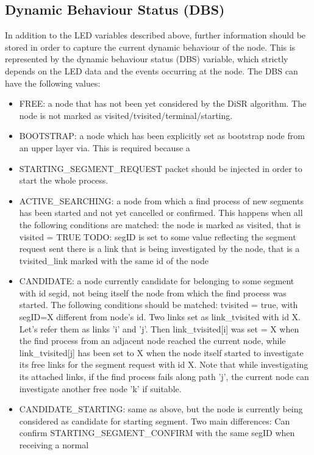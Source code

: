 \documentclass[final,journal,letterpaper]{IEEEtran}
\begin{document}
\subsection{Dynamic Behaviour Status (DBS)}
In addition to the LED variables described above, further information
should be stored in order to capture the current dynamic behaviour of
the node. This is represented by the dynamic behaviour status (DBS)
variable, which strictly depends on the LED data and the events
occurring at the node. The DBS can have the following values:

\begin{itemize}
\item{FREE}: a node that has  not been yet considered  by the DiSR algorithm.
The node is not marked as visited/tvisited/terminal/starting.
\item{BOOTSTRAP}: a node which has been explicitly set as bootstrap node from
an upper layer via. This is required because a
\item{STARTING\_SEGMENT\_REQUEST} packet should be injected in order to start
the whole process.
\item{ACTIVE\_SEARCHING}: a node from which a find process of new segments has
been started and not yet cancelled or confirmed. This happens when all
the following conditions are matched: the node is marked as visited,
that is visited = TRUE 
TODO: segID is set to some value reflecting
the segment request sent there is a link that is being investigated by
the node, that is a tvisited\_link marked with the same id of the node 
\item{CANDIDATE}: a node currently candidate for belonging to some segment
with id segid, not being itself the node from which the find process
was started. The following conditions should be matched: tvisited =
true, with segID=X different from node's id.  Two links set as
link\_tvisited with id X. Let’s refer them as  links 'i' and 'j'. Then
link\_tvisited[i] was set = X when the find process from an adjacent
node reached the current node, while link\_tvisited[j] has been set to
X when the node itself started to investigate its free links for the
segment request with id X. Note that while investigating its attached
links, if the find process fails along path 'j', the current node can
investigate another free node 'k' if suitable.  
\item{CANDIDATE\_STARTING}: same as above, but the node is currently being considered as candidate
for starting segment. Two main differences: Can confirm
STARTING\_SEGMENT\_CONFIRM with the same segID when receiving a normal

\end{itemize}
\end{document}
